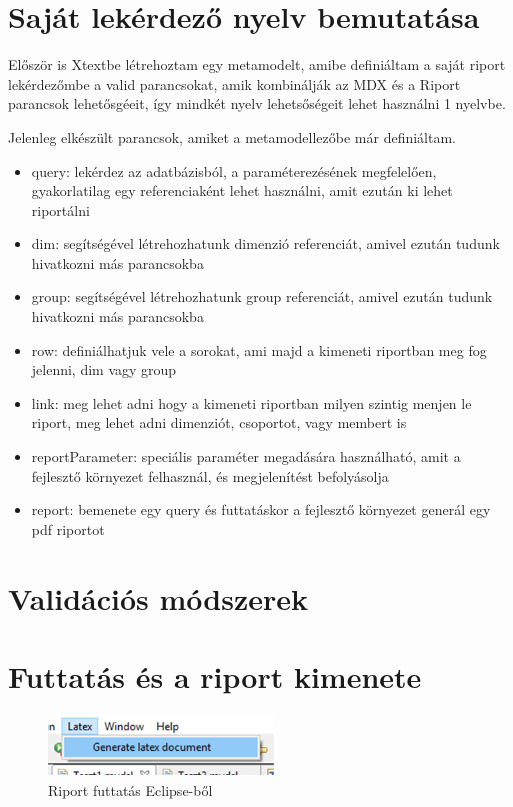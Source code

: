 \section{Saját lekérdező nyelv bemutatása}

Először is Xtextbe létrehoztam egy metamodelt, amibe definiáltam a saját riport
lekérdezőmbe a valid parancsokat, amik kombinálják az MDX és a Riport parancsok
lehetősgéeit, így mindkét nyelv lehetsőségeit lehet használni 1 nyelvbe.

Jelenleg elkészült parancsok, amiket a metamodellezőbe már definiáltam.
\begin{itemize}
  \item query: lekérdez az adatbázisból, a paraméterezésének megfelelően,
  gyakorlatilag egy referenciaként lehet használni, amit ezután ki lehet
  riportálni
  \item dim: segítségével létrehozhatunk dimenzió referenciát, amivel ezután
  tudunk hivatkozni más parancsokba
  \item group: segítségével létrehozhatunk group referenciát, amivel ezután
  tudunk hivatkozni más parancsokba
  \item row: definiálhatjuk vele a sorokat, ami majd a kimeneti riportban meg
  fog jelenni, dim vagy group
  \item link: meg lehet adni hogy a kimeneti riportban milyen szintig menjen le
  riport, meg lehet adni dimenziót, csoportot, vagy membert is
  \item reportParameter: speciális paraméter megadására használható, amit a
  fejlesztő környezet felhasznál, és megjelenítést befolyásolja
  \item report: bemenete egy query és futtatáskor a fejlesztő környezet generál
  egy pdf riportot 
\end{itemize}


\section{Validációs módszerek}

\section{Futtatás és a riport kimenete}
 \begin{figure}[!ht]
\centering
\includegraphics[width=60mm, keepaspectratio]{figures/run.png}
\caption{Riport futtatás Eclipse-ből} 
\label{fig:Overview}
\end{figure}



